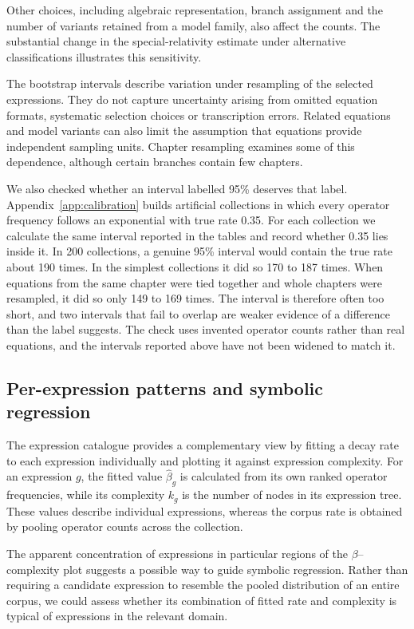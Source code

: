 \documentclass[10pt]{article}
\begin{document}
Other choices, including algebraic representation, branch assignment and the number of variants retained from a model family, also affect the counts. The substantial change in the special-relativity estimate under alternative classifications illustrates this sensitivity.

The bootstrap intervals describe variation under resampling of the selected expressions. They do not capture uncertainty arising from omitted equation formats, systematic selection choices or transcription errors. Related equations and model variants can also limit the assumption that equations provide independent sampling units. Chapter resampling examines some of this dependence, although certain branches contain few chapters.

We also checked whether an interval labelled 95\% deserves that label. Appendix~\ref{app:calibration} builds artificial collections in which every operator frequency follows an exponential with true rate 0.35. For each collection we calculate the same interval reported in the tables and record whether 0.35 lies inside it. In 200 collections, a genuine 95\% interval would contain the true rate about 190 times. In the simplest collections it did so 170 to 187 times. When equations from the same chapter were tied together and whole chapters were resampled, it did so only 149 to 169 times. The interval is therefore often too short, and two intervals that fail to overlap are weaker evidence of a difference than the label suggests. The check uses invented operator counts rather than real equations, and the intervals reported above have not been widened to match it.

\subsection{Per-expression patterns and symbolic regression}
The expression catalogue provides a complementary view by fitting a decay rate to each expression individually and plotting it against expression complexity. For an expression $g$, the fitted value $\hat\beta_g$ is calculated from its own ranked operator frequencies, while its complexity $k_g$ is the number of nodes in its expression tree. These values describe individual expressions, whereas the corpus rate is obtained by pooling operator counts across the collection.

The apparent concentration of expressions in particular regions of the $\beta$--complexity plot suggests a possible way to guide symbolic regression. Rather than requiring a candidate expression to resemble the pooled distribution of an entire corpus, we could assess whether its combination of fitted rate and complexity is typical of expressions in the relevant domain.
\end{document}

